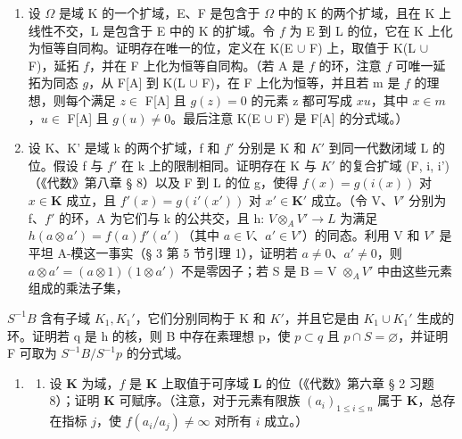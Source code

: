 
\begin{enumerate}
\def\labelenumi{\arabic{enumi}.}
\item
  设 \(\Omega\) 是域 K 的一个扩域，E、F 是包含于 \(\Omega\) 中的 K 的两个扩域，且在 K 上线性不交，L 是包含于 E 中的 K 的扩域。令 \(f\) 为 E 到 L 的位，它在 K 上化为恒等自同构。证明存在唯一的位，定义在 K(E \(\cup\) F) 上，取值于 K(L \(\cup\) F)，延拓 \(f\)，并在 F 上化为恒等自同构。（若 A 是 \(f\) 的环，注意 \(f\) 可唯一延拓为同态 \(g\)，从 F{[}A{]} 到 K(L \(\cup\) F)，在 F 上化为恒等，并且若 m 是 \(f\) 的理想，则每个满足 \(z \in\) F{[}A{]} 且 \(g(z) = 0\) 的元素 z 都可写成 \(xu\)，其中 \(x \in m\)，\(u \in\) F{[}A{]} 且 \(g(u) \neq 0\)。最后注意 K(E \(\cup\) F) 是 F{[}A{]} 的分式域。）
\item
  设 K、K' 是域 k 的两个扩域，f 和 \(f'\) 分别是 K 和 \(K'\) 到同一代数闭域 L 的位。假设 f 与 \(f'\) 在 k 上的限制相同。证明存在 K 与 \(K'\) 的复合扩域 (F, i, i')（《代数》第八章 § 8）以及 F 到 L 的位 g，使得 \(f(x) = g(i(x))\) 对 \(x \in \mathbf{K}\) 成立，且 \(f'(x) = g(i'(x'))\) 对 \(x' \in \mathbf{K}'\) 成立。（令 V、\(V'\) 分别为 f、\(f'\) 的环，A 为它们与 k 的公共交，且 h: \(V \otimes_{A} V' \to L\) 为满足 \(h(a \otimes a') = f(a)f'(a')\)（其中 \(a \in V\)、\(a' \in V'\)）的同态。利用 V 和 \(V'\) 是平坦 A-模这一事实（§ 3 第 5 节引理 1），证明若 \(a \neq 0\)、\(a' \neq 0\)，则 \(a \otimes a' = (a \otimes 1)(1 \otimes a')\) 不是零因子；若 S 是 B = V \(\otimes_{A} V'\) 中由这些元素组成的乘法子集，
\end{enumerate}

\(S^{-1}B\) 含有子域 \(K_{1}, K_{1}'\)，它们分别同构于 K 和 \(K'\)，并且它是由 \(K_{1} \cup K_{1}'\) 生成的环。证明若 q 是 h 的核，则 B 中存在素理想 p，使 \(p \subset q\) 且 \(p \cap S = \varnothing\)，并证明 F 可取为 \(S^{-1}B/S^{-1}p\) 的分式域。

\begin{enumerate}
\def\labelenumi{\arabic{enumi}.}
\setcounter{enumi}{2}
\tightlist
\item
  \begin{enumerate}
  \def\labelenumii{(\alph{enumii})}
  \tightlist
  \item
    设 \(\mathbf{K}\) 为域，\(f\) 是 \(\mathbf{K}\) 上取值于可序域 \(\mathbf{L}\) 的位（《代数》第六章 § 2 习题 8）；证明 \(\mathbf{K}\) 可赋序。（注意，对于元素有限族 \((a_i)_{1\leq i\leq n}\) 属于 \(\mathbf{K}\)，总存在指标 \(j\)，使 \(f(a_i / a_j)\neq \infty\) 对所有 \(i\) 成立。）
  \end{enumerate}
\end{enumerate}

